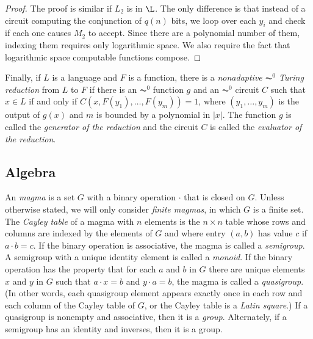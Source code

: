 \documentclass{article}
\begin{document}
\begin{proof}
  The proof is similar if $L_2$ is in $\L$.
  The only difference is that instead of a circuit computing the conjunction of $q(n)$ bits, we loop over each $y_i$ and check if each one causes $M_2$ to accept.
  Since there are a polynomial number of them, indexing them requires only logarithmic space.
  We also require the fact that logarithmic space computable functions compose.
\end{proof}

Finally, if $L$ is a language and $F$ is a function, there is a \emph{nonadaptive $\AC^0$ Turing reduction} from $L$ to $F$ if there is an $\AC^0$ function $g$ and an $\AC^0$ circuit $C$ such that $x \in L$ if and only if $C(x, F(y_1), \dotsc, F(y_m)) = 1$, where $(y_1, \dotsc, y_m)$ is the output of $g(x)$ and $m$ is bounded by a polynomial in $|x|$.
The function $g$ is called the \emph{generator of the reduction} and the circuit $C$ is called the \emph{evaluator of the reduction}.

\subsection{Algebra}

An \emph{magma} is a set $G$ with a binary operation $\cdot$ that is closed on $G$.
Unless otherwise stated, we will only consider \emph{finite magmas}, in which $G$ is a finite set.
The \emph{Cayley table} of a magma with $n$ elements is the $n \times n$ table whose rows and columns are indexed by the elements of $G$ and where entry $(a, b)$ has value $c$ if $a \cdot b = c$.
If the binary operation is associative, the magma is called a \emph{semigroup}.
A semigroup with a unique identity element is called a \emph{monoid}.
If the binary operation has the property that for each $a$ and $b$ in $G$ there are unique elements $x$ and $y$ in $G$ such that $a \cdot x = b$ and $y \cdot a = b$, the magma is called a \emph{quasigroup}.
(In other words, each quasigroup element appears exactly once in each row and each column of the Cayley table of $G$, or the Cayley table is a \emph{Latin square}.)
If a quasigroup is nonempty and associative, then it is a \emph{group}.
Alternately, if a semigroup has an identity and inverses, then it is a group.
\end{document}
